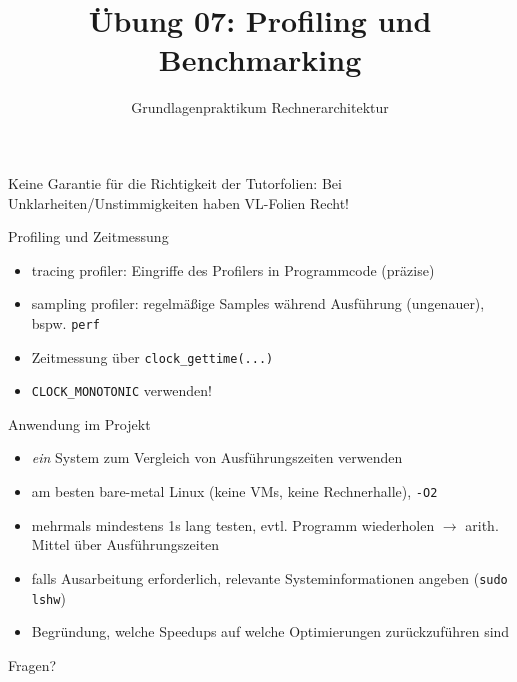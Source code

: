 

\title{Übung 07: Profiling und Benchmarking}
\subtitle{Grundlagenpraktikum Rechnerarchitektur}
\date{}



\maketitle

\begin{frame}[c]{}{}
	\begin{center}
		\LARGE  Keine Garantie für die Richtigkeit der Tutorfolien: Bei Unklarheiten/Unstimmigkeiten
		haben VL-Folien Recht!
	\end{center}
\end{frame}

\begin{frame}[c, fragile]{Profiling und Zeitmessung}{}
	\begin{itemize}
		\item tracing profiler: Eingriffe des Profilers in Programmcode (präzise)
		\item sampling profiler: regelmäßige Samples während Ausführung (ungenauer), bspw. \verb|perf|
		\item Zeitmessung über \verb|clock_gettime(...)|
		\item \verb|CLOCK_MONOTONIC| verwenden!
	\end{itemize}
\end{frame}


\begin{frame}[c, fragile]{Anwendung im Projekt}{}
	\begin{itemize}
		\item \textit{ein} System zum Vergleich von Ausführungszeiten verwenden
		\item am besten bare-metal Linux (keine VMs, keine Rechnerhalle), \verb|-O2|
		\item mehrmals mindestens 1s lang testen, evtl. Programm wiederholen $\rightarrow$ arith. Mittel über Ausführungszeiten
		\item falls Ausarbeitung erforderlich, relevante Systeminformationen angeben (\verb|sudo lshw|)
		\item Begründung, welche Speedups auf welche Optimierungen zurückzuführen sind
	\end{itemize}
\end{frame}

\begin{frame}[c]{}{}
	\begin{center}
		\LARGE Fragen?
	\end{center}
\end{frame}

